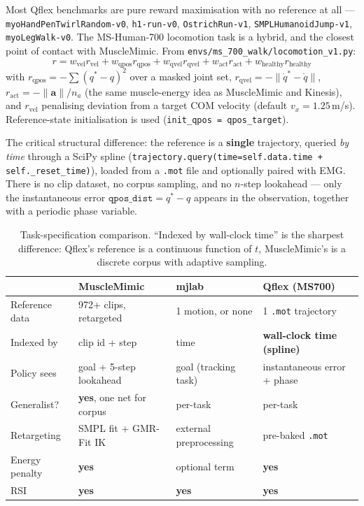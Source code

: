 \documentclass[11pt,a4paper]{article}
\newcommand{\yes}{\textbf{yes}}
\begin{document}
Most Qflex benchmarks are pure reward maximisation with no reference at all ---
\texttt{myoHandPenTwirlRandom-v0}, \texttt{h1-run-v0}, \texttt{OstrichRun-v1},
\texttt{SMPLHumanoidJump-v1}, \texttt{myoLegWalk-v0}. The MS-Human-700 locomotion task is
a hybrid, and the closest point of contact with MuscleMimic. From
\texttt{envs/ms\_700\_walk/locomotion\_v1.py}:
\begin{equation}
r = w_{\text{vel}} r_{\text{vel}} + w_{\text{qpos}} r_{\text{qpos}}
  + w_{\text{qvel}} r_{\text{qvel}} + w_{\text{act}} r_{\text{act}}
  + w_{\text{healthy}} r_{\text{healthy}}
\end{equation}
with $r_{\text{qpos}} = -\sum (q^{*} - q)^2$ over a masked joint set,
$r_{\text{qvel}} = -\|\dot q^{*} - \dot q\|$,
$r_{\text{act}} = -\|\mathbf{a}\|/n_a$ (the same muscle-energy idea as MuscleMimic and
Kinesis), and $r_{\text{vel}}$ penalising deviation from a target COM velocity
(default $v_x = 1.25$\,m/s). Reference-state initialisation is used
(\texttt{init\_qpos = qpos\_target}).

The critical structural difference: the reference is a \textbf{single} trajectory,
queried \emph{by time} through a SciPy spline
(\texttt{trajectory.query(time=self.data.time + self.\_reset\_time)}), loaded from a
\texttt{.mot} file and optionally paired with EMG. There is no clip dataset, no corpus
sampling, and no $n$-step lookahead --- only the instantaneous error
$\texttt{qpos\_dist} = q^{*} - q$ appears in the observation, together with a periodic
phase variable.

\begin{table}[h!]
\centering
\small
\begin{tabular}{@{}lL{3.0cm}L{3.0cm}L{3.6cm}@{}}
\toprule
 & \textcolor{mmC}{MuscleMimic} & \textcolor{mjC}{mjlab} & \textcolor{qfC}{Qflex (MS700)} \\
\midrule
Reference data   & 972+ clips, retargeted & 1 motion, or none & 1 \texttt{.mot} trajectory \\
Indexed by       & clip id + step & time & \textbf{wall-clock time (spline)} \\
Policy sees      & goal + 5-step lookahead & goal (tracking task) & instantaneous error + phase \\
Generalist?      & \yes, one net for corpus & per-task & per-task \\
Retargeting      & SMPL fit + GMR-Fit IK & external preprocessing & pre-baked \texttt{.mot} \\
Energy penalty   & \yes & optional term & \yes \\
RSI              & \yes & \yes & \yes \\
\bottomrule
\end{tabular}
\caption{Task-specification comparison. ``Indexed by wall-clock time'' is the sharpest
difference: Qflex's reference is a continuous function of $t$, MuscleMimic's is a
discrete corpus with adaptive sampling.}
\end{table}
\end{document}
